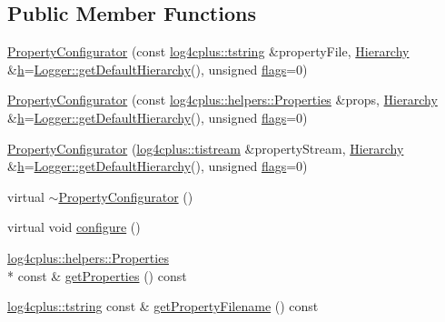 \subsection*{Public Member Functions}
\begin{DoxyCompactItemize}
\item 
\hyperlink{classlog4cplus_1_1PropertyConfigurator_af6b87ca97967f2f600f22d19002f47d6}{Property\-Configurator} (const \hyperlink{namespacelog4cplus_a3c9287f6ebcddc50355e29d71152117b}{log4cplus\-::tstring} \&property\-File, \hyperlink{classlog4cplus_1_1Hierarchy}{Hierarchy} \&\hyperlink{classlog4cplus_1_1PropertyConfigurator_ae80f772be9d4eb67922d34f4e2dd71d1}{h}=\hyperlink{classlog4cplus_1_1Logger_a8d258d78a9a86f1f3a3241f43d015287}{Logger\-::get\-Default\-Hierarchy}(), unsigned \hyperlink{classlog4cplus_1_1PropertyConfigurator_af813851c5e5b234239b7ea974fb8e4b2}{flags}=0)
\item 
\hyperlink{classlog4cplus_1_1PropertyConfigurator_a20b52dc0893e889b8a0f04c7fb3ae301}{Property\-Configurator} (const \hyperlink{classlog4cplus_1_1helpers_1_1Properties}{log4cplus\-::helpers\-::\-Properties} \&props, \hyperlink{classlog4cplus_1_1Hierarchy}{Hierarchy} \&\hyperlink{classlog4cplus_1_1PropertyConfigurator_ae80f772be9d4eb67922d34f4e2dd71d1}{h}=\hyperlink{classlog4cplus_1_1Logger_a8d258d78a9a86f1f3a3241f43d015287}{Logger\-::get\-Default\-Hierarchy}(), unsigned \hyperlink{classlog4cplus_1_1PropertyConfigurator_af813851c5e5b234239b7ea974fb8e4b2}{flags}=0)
\item 
\hyperlink{classlog4cplus_1_1PropertyConfigurator_a473d1fcc692e6c74cef930dac00561a3}{Property\-Configurator} (\hyperlink{namespacelog4cplus_aa09fa8d7ec3f48e80ed15d5a1dbc38a7}{log4cplus\-::tistream} \&property\-Stream, \hyperlink{classlog4cplus_1_1Hierarchy}{Hierarchy} \&\hyperlink{classlog4cplus_1_1PropertyConfigurator_ae80f772be9d4eb67922d34f4e2dd71d1}{h}=\hyperlink{classlog4cplus_1_1Logger_a8d258d78a9a86f1f3a3241f43d015287}{Logger\-::get\-Default\-Hierarchy}(), unsigned \hyperlink{classlog4cplus_1_1PropertyConfigurator_af813851c5e5b234239b7ea974fb8e4b2}{flags}=0)
\item 
virtual \hyperlink{classlog4cplus_1_1PropertyConfigurator_a9633f32d70f0536037fd24511b8d9e4c}{$\sim$\-Property\-Configurator} ()
\item 
virtual void \hyperlink{classlog4cplus_1_1PropertyConfigurator_a21e8e6b1440cc7a8a47b8fd14c54b239}{configure} ()
\item 
\hyperlink{classlog4cplus_1_1helpers_1_1Properties}{log4cplus\-::helpers\-::\-Properties} \\*
const \& \hyperlink{classlog4cplus_1_1PropertyConfigurator_a75479e09a78c6c5bfe0b1c2f62069023}{get\-Properties} () const 
\item 
\hyperlink{namespacelog4cplus_a3c9287f6ebcddc50355e29d71152117b}{log4cplus\-::tstring} const \& \hyperlink{classlog4cplus_1_1PropertyConfigurator_a48fc2e396c6090ab439161903396393d}{get\-Property\-Filename} () const 
\end{DoxyCompactItemize}
